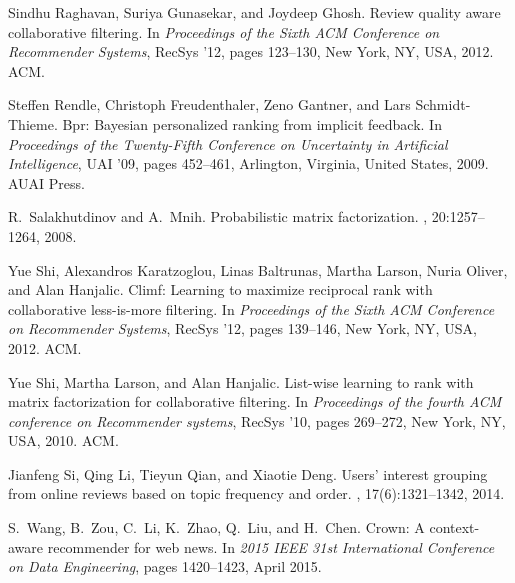 \documentclass[preprint,12pt]{elsarticle}
\begin{document}
\begin{thebibliography}{10}
Sindhu Raghavan, Suriya Gunasekar, and Joydeep Ghosh.
\newblock Review quality aware collaborative filtering.
\newblock In {\em Proceedings of the Sixth ACM Conference on Recommender
  Systems}, RecSys '12, pages 123--130, New York, NY, USA, 2012. ACM.

Steffen Rendle, Christoph Freudenthaler, Zeno Gantner, and Lars Schmidt-Thieme.
\newblock Bpr: Bayesian personalized ranking from implicit feedback.
\newblock In {\em Proceedings of the Twenty-Fifth Conference on Uncertainty in
  Artificial Intelligence}, UAI '09, pages 452--461, Arlington, Virginia,
  United States, 2009. AUAI Press.

R.~Salakhutdinov and A.~Mnih.
\newblock Probabilistic matrix factorization.
,
  20:1257--1264, 2008.

Yue Shi, Alexandros Karatzoglou, Linas Baltrunas, Martha Larson, Nuria Oliver,
  and Alan Hanjalic.
\newblock Climf: Learning to maximize reciprocal rank with collaborative
  less-is-more filtering.
\newblock In {\em Proceedings of the Sixth ACM Conference on Recommender
  Systems}, RecSys '12, pages 139--146, New York, NY, USA, 2012. ACM.

Yue Shi, Martha Larson, and Alan Hanjalic.
\newblock List-wise learning to rank with matrix factorization for
  collaborative filtering.
\newblock In {\em Proceedings of the fourth ACM conference on Recommender
  systems}, RecSys '10, pages 269--272, New York, NY, USA, 2010. ACM.

Jianfeng Si, Qing Li, Tieyun Qian, and Xiaotie Deng.
\newblock Users’ interest grouping from online reviews based on topic
  frequency and order.
, 17(6):1321–1342, 2014.

S.~Wang, B.~Zou, C.~Li, K.~Zhao, Q.~Liu, and H.~Chen.
\newblock Crown: A context-aware recommender for web news.
\newblock In {\em 2015 IEEE 31st International Conference on Data Engineering},
  pages 1420--1423, April 2015.

\end{thebibliography}
\end{document}
